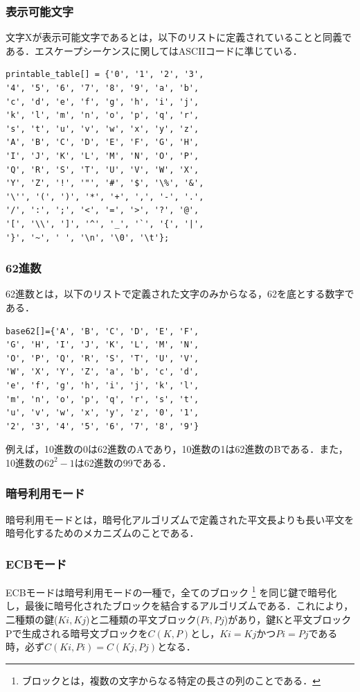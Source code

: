 \documentclass[a4p]{jarticle}
\begin{document}
\subsubsection{表示可能文字}
文字Xが表示可能文字であるとは，以下のリストに定義されていることと同義である．エスケープシーケンスに関してはASCIIコードに準じている．
\begin{verbatim}
printable_table[] = {'0', '1', '2', '3', 
'4', '5', '6', '7', '8', '9', 'a', 'b', 
'c', 'd', 'e', 'f', 'g', 'h', 'i', 'j', 
'k', 'l', 'm', 'n', 'o', 'p', 'q', 'r', 
's', 't', 'u', 'v', 'w', 'x', 'y', 'z', 
'A', 'B', 'C', 'D', 'E', 'F', 'G', 'H', 
'I', 'J', 'K', 'L', 'M', 'N', 'O', 'P',
'Q', 'R', 'S', 'T', 'U', 'V', 'W', 'X', 
'Y', 'Z', '!', '"', '#', '$', '\%', '&', 
'\'', '(', ')', '*', '+', ',', '-', '.', 
'/', ':', ';', '<', '=', '>', '?', '@', 
'[', '\\', ']', '^', '_', '`', '{', '|', 
'}', '~', ' ', '\n', '\0', '\t'};
\end{verbatim}

\subsubsection{62進数}
62進数とは，以下のリストで定義された文字のみからなる，62を底とする数字である．
\begin{verbatim}
base62[]={'A', 'B', 'C', 'D', 'E', 'F', 
'G', 'H', 'I', 'J', 'K', 'L', 'M', 'N', 
'O', 'P', 'Q', 'R', 'S', 'T', 'U', 'V', 
'W', 'X', 'Y', 'Z', 'a', 'b', 'c', 'd', 
'e', 'f', 'g', 'h', 'i', 'j', 'k', 'l', 
'm', 'n', 'o', 'p', 'q', 'r', 's', 't', 
'u', 'v', 'w', 'x', 'y', 'z', '0', '1', 
'2', '3', '4', '5', '6', '7', '8', '9'}
\end{verbatim}
例えば，10進数の0は62進数のAであり，10進数の1は62進数のBである．また，10進数の\(62^2-1\)は62進数の99である．

\subsubsection{暗号利用モード}
暗号利用モードとは，暗号化アルゴリズムで定義された平文長よりも長い平文を暗号化するためのメカニズムのことである．

\subsubsection{ECBモード}
ECBモードは暗号利用モードの一種で，全てのブロック \footnote{ブロックとは，複数の文字からなる特定の長さの列のことである．} を同じ鍵で暗号化し，最後に暗号化されたブロックを結合するアルゴリズムである．これにより，二種類の鍵(\(Ki,Kj\))と二種類の平文ブロック(\(Pi,Pj\))があり，鍵Kと平文ブロックPで生成される暗号文ブロックを\(C(K,P)\)とし，\(Ki=Kj\)かつ\(Pi=Pj\)である時，必ず\(C(Ki,Pi)=C(Kj,Pj)\)となる．
\end{document}
